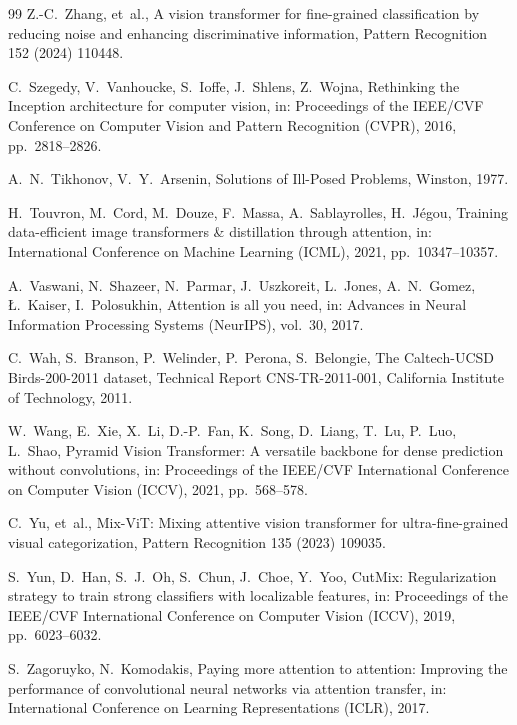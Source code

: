\documentclass[review,12pt,authoryear]{elsarticle}
\begin{document}
\begin{thebibliography}{99}
Z.-C.~Zhang, et~al.,
A vision transformer for fine-grained classification by reducing noise and enhancing discriminative information,
Pattern Recognition 152 (2024) 110448.

C.~Szegedy, V.~Vanhoucke, S.~Ioffe, J.~Shlens, Z.~Wojna,
Rethinking the Inception architecture for computer vision,
in: Proceedings of the IEEE/CVF Conference on Computer Vision and Pattern Recognition (CVPR), 2016, pp.~2818--2826.

A.~N.~Tikhonov, V.~Y.~Arsenin,
Solutions of Ill-Posed Problems,
Winston, 1977.

H.~Touvron, M.~Cord, M.~Douze, F.~Massa, A.~Sablayrolles, H.~J{\'e}gou,
Training data-efficient image transformers \& distillation through attention,
in: International Conference on Machine Learning (ICML), 2021, pp.~10347--10357.

A.~Vaswani, N.~Shazeer, N.~Parmar, J.~Uszkoreit, L.~Jones, A.~N.~Gomez, {\L}.~Kaiser, I.~Polosukhin,
Attention is all you need,
in: Advances in Neural Information Processing Systems (NeurIPS), vol.~30, 2017.

C.~Wah, S.~Branson, P.~Welinder, P.~Perona, S.~Belongie,
The Caltech-UCSD Birds-200-2011 dataset,
Technical Report CNS-TR-2011-001, California Institute of Technology, 2011.

W.~Wang, E.~Xie, X.~Li, D.-P.~Fan, K.~Song, D.~Liang, T.~Lu, P.~Luo, L.~Shao,
Pyramid Vision Transformer: A versatile backbone for dense prediction without convolutions,
in: Proceedings of the IEEE/CVF International Conference on Computer Vision (ICCV), 2021, pp.~568--578.

C.~Yu, et~al.,
Mix-ViT: Mixing attentive vision transformer for ultra-fine-grained visual categorization,
Pattern Recognition 135 (2023) 109035.

S.~Yun, D.~Han, S.~J.~Oh, S.~Chun, J.~Choe, Y.~Yoo,
CutMix: Regularization strategy to train strong classifiers with localizable features,
in: Proceedings of the IEEE/CVF International Conference on Computer Vision (ICCV), 2019, pp.~6023--6032.

S.~Zagoruyko, N.~Komodakis,
Paying more attention to attention: Improving the performance of convolutional neural networks via attention transfer,
in: International Conference on Learning Representations (ICLR), 2017.


\end{thebibliography}
\end{document}
